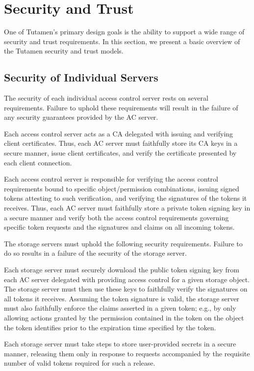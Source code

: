 \section{Security and Trust}
\label{sec:trust}

One of Tutamen's primary design goals is the ability to support a wide
range of security and trust requirements. In this section, we present
a basic overview of the Tutamen security and trust models.

\subsection{Security of Individual Servers}

The security of each individual access control server rests on several
requirements. Failure to uphold these requirements will result in the
failure of any security guarantees provided by the AC server.

\begin{packed_desc}
\item[Certificate Authority Role:] Each access control server acts as
  a CA delegated with issuing and verifying client certificates. Thus,
  each AC server must faithfully store its CA keys in a secure manner,
  issue client certificates, and verify the certificate presented by
  each client connection.
\item[Token Issuance and Verification:] Each access control server is
  responsible for verifying the access control requirements bound to
  specific object/permission combinations, issuing signed tokens
  attesting to such verification, and verifying the signatures of the
  tokens it receives. Thus, each AC server must faithfully store a
  private token signing key in a secure manner and verify both the
  access control requirements governing specific token requests and
  the signatures and claims on all incoming tokens.
\end{packed_desc}

The storage servers must uphold the following security
requirements. Failure to do so results in a failure of the security of
the storage server.

\begin{packed_desc}
\item[Token Verification:] Each storage server must securely download
  the public token signing key from each AC server delegated with
  providing access control for a given storage object. The storage
  server must then use these keys to faithfully verify the signatures
  on all tokens it receives. Assuming the token signature is valid,
  the storage server must also faithfully enforce the claims asserted
  in a given token; e.g., by only allowing actions granted by the
  permission contained in the token on the object the token identifies
  prior to the expiration time specified by the token.
\item[Secure Storage:] Each storage server must take steps to store
  user-provided secrets in a secure manner, releasing them only in
  response to requests accompanied by the requisite number of valid
  tokens required for such a release.
\end{packed_desc}

